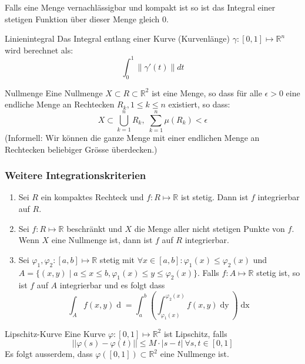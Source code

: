 \documentclass[a4paper,10pt]{article}
\def\R{\mathbb{R}}
\begin{document}
Falls eine Menge vernachlässigbar und kompakt ist so ist das Integral einer stetigen Funktion über dieser Menge gleich $0$.

\begin{subbox}{Linienintegral}
  Das Integral entlang einer Kurve (Kurvenlänge) $\gamma: [0, 1] \mapsto \R^n$ wird berechnet als:
  $$\int_0^1 \lVert \gamma'(t) \rVert dt$$
\end{subbox}

\begin{mainbox}{Nullmenge}
  Eine Nullmenge \(X \subset R \subset \R^2\) ist eine Menge, so dass für alle \(\epsilon > 0\) eine endliche Menge an Rechtecken \(R_k, 1 \le k \le n\) existiert, so dass:
  \[X \subset \bigcup_{k = 1}^n R_k, \; \sum_{k = 1}^n \mu (R_k) < \epsilon\]
  (Informell: Wir können die ganze Menge mit einer endlichen Menge an Rechtecken beliebiger Grösse überdecken.)
\end{mainbox}

\subsubsection*{Weitere Integrationskriterien}
\begin{enumerate}
  \item Sei \(R\) ein kompaktes Rechteck und \(f: R \mapsto \R\) ist stetig. Dann ist \(f\) integrierbar auf \(R\).
  \item Sei \(f: R \mapsto \R\) beschränkt und \(X\) die Menge aller nicht stetigen Punkte von \(f\). Wenn \(X\) eine Nullmenge ist, dann ist \(f\) auf \(R\) integrierbar.
  \item Sei \(\varphi_1, \varphi_2: \left[a,b\right]\mapsto \R\) stetig mit \(\forall x \in \left[a,b\right]: \varphi_1(x) \le \varphi_2(x)\) und \(A = \{(x,y)\mid a\le x \le b, \varphi_1(x) \le y \le \varphi_2(x)\}\). Falls \(f: A \mapsto \R\) stetig ist, so ist \(f\) auf \(A\) integrierbar und es folgt dass
  \[\int_A f(x,y) \mathop{d(x,y)} = \int_a^b \left(\int_{\varphi_1(x)}^{\varphi_2(x)} f(x,y) \mathop{dy}\right) \mathop{dx}\]
\end{enumerate}

\begin{subbox}{Lipschitz-Kurve}
  Eine Kurve \(\varphi : \left[0, 1\right] \mapsto \R^2\) ist Lipschitz, falls
  \[||\varphi(s) - \varphi(t)|| \le M \cdot |s-t| \ \forall s,t \in \left[0,1\right]\]
  Es folgt ausserdem, dass \(\varphi(\left[0,1\right]) \subset \R^2\) eine Nullmenge ist.
\end{subbox}
\end{document}
